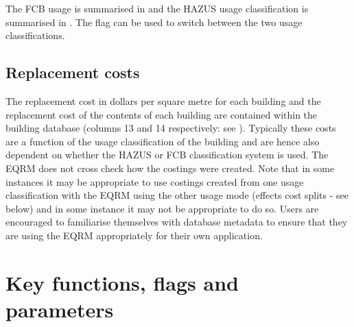 The FCB usage is summarised in
 and the HAZUS usage
classification is summarised in
. The  flag
 can be used to switch between
the two usage classifications.


\subsection{Replacement costs}
\label{sec:grids-replacecosts}


The replacement cost in dollars per square metre for each building
and the replacement cost of the contents of each building are
contained within the building database
(columns 13 and 14 respectively: see ).
Typically these costs are a function of the usage classification
of the building and are hence also dependent on whether the
HAZUS or FCB classification system is used. The EQRM does not cross
check how the costings were created. Note that in some instances
it may be appropriate to use costings created from one usage
classification with the EQRM using the other usage mode (effects
cost splits - see below) and in some instance it may not be
appropriate to do so. Users are encouraged to familiarise
themselves with database metadata to ensure that they are using
the EQRM appropriately for their own application.

\clearpage
\section{Key functions, flags and parameters}

